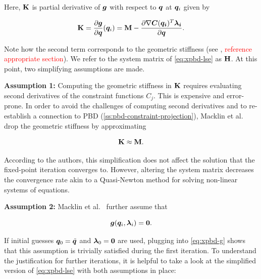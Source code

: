 \noindent Here, $\mathbf{K}$ is partial derivative of $\bm{g}$ with respect to $\bm{q}$ at $\bm{q}_i$ given by

\begin{equation}\label{eq:xpbd-K}
    \mathbf{K} = \frac{\partial \bm{g}}{\partial \bm{q}}(\bm{q}_i) = \mathbf{M} - \frac{\partial \nabla \bm{C}(\bm{q_i})^T \bm{\lambda_i}}{\partial \bm{q}}.
\end{equation}

\noindent Note how the second term corresponds to the geometric stiffness (see \cite{tournier2015}, \textcolor{red}{reference appropriate section}). 
We refer to the system matrix of \autoref{eq:xpbd-lse} as $\mathbf{H}$. At this point, two simplifying assumptions are made.

\textbf{Assumption 1:} Computing the geometric stiffness in $\mathbf{K}$ requires evaluating second derivatives of the constraint functions
$C_j$. This is expensive and error-prone. In order to avoid the challenges of computing second derivatives and to re-establish a connection 
to PBD (\cref{ss:pbd-constraint-projection}), Macklin et al.\ \cite{macklin2016} drop the geometric stiffness by approximating 

\begin{equation}\label{eq:xpbd-assumption-1}
    \mathbf{K} \approx \mathbf{M}. 
\end{equation}

\noindent According to the authors, this simplification does not affect the solution that the fixed-point iteration converges to. However, 
altering the system matrix decreases the convergence rate akin to a Quasi-Newton method for solving non-linear systems of equations.

\textbf{Assumption 2:} Macklin et al.\ \cite{macklin2016} further assume that 

\begin{equation}\label{eq:xpbd-assumption-2}
    \bm{g}(\bm{q}_i, \bm{\lambda}_i) = \bm{0}. 
\end{equation}

\noindent If initial guesses
$\bm{q}_0 = \tilde{\bm{q}}$ and $\bm{\lambda}_0 = \bm{0}$ are used, plugging into \autoref{eq:xpbd-g} shows that this assumption is trivially
satisfied during the first iteration. To understand the justification for further iterations, it is helpful to take a look at the simplified
version of \autoref{eq:xpbd-lse} with both assumptions in place:

